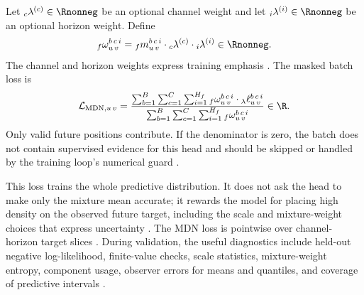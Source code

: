 Let ${}_{c}\lambda^{(c)}\in\Rnonneg$ be an optional channel weight and let
${}_{i}\lambda^{(i)}\in\Rnonneg$ be an optional horizon weight.  Define
\[
  {}_{f}\omega_{u\,v}^{b\,c\,i}
  =
  {}_{f}m_{u\,v}^{b\,c\,i}
  \cdot
  {}_{c}\lambda^{(c)}
  \cdot
  {}_{i}\lambda^{(i)}
  \in\Rnonneg.
\]
The channel and horizon weights express training emphasis%
.
The masked batch loss is
\[
  \mathcal{L}_{\mathrm{MDN},u\,v}
  =
  \frac{
    \sum_{b=1}^{B}
    \sum_{c=1}^{C}
    \sum_{i=1}^{H_f}
    {}_{f}\omega_{u\,v}^{b\,c\,i}\cdot
    {}_{\lambda}\ell_{u\,v}^{b\,c\,i}
  }{
    \sum_{b=1}^{B}
    \sum_{c=1}^{C}
    \sum_{i=1}^{H_f}
    {}_{f}\omega_{u\,v}^{b\,c\,i}
  }
  \in\R.
\]
Only valid future positions contribute.  If the denominator is zero, the batch
does not contain supervised evidence for this head and should be skipped or
handled by the training loop's numerical guard%
.

This loss trains the whole predictive distribution.  It does not ask the head
to make only the mixture mean accurate; it rewards the model for placing high
density on the observed future target, including the scale and mixture-weight
choices that express uncertainty%
.
The MDN loss is pointwise over channel-horizon target slices%
.
During validation, the useful diagnostics include held-out negative
log-likelihood, finite-value checks, scale statistics, mixture-weight entropy,
component usage, observer errors for means and quantiles, and coverage of
predictive intervals%
.



